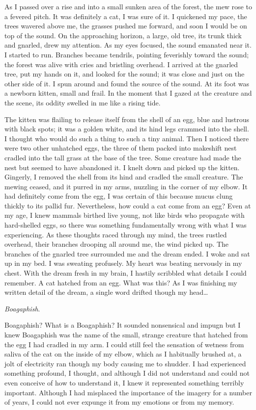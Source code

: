 \documentclass[
]{article}
\begin{document}
As I passed over a rise and into a small sunken area of the forest, the
mew rose to a fevered pitch. It was definitely a cat, I was sure of it.
I quickened my pace, the trees wavered above me, the grasses pushed me
forward, and soon I would be on top of the sound. On the approaching
horizon, a large, old tree, its trunk thick and gnarled, drew my
attention. As my eyes focused, the sound emanated near it. I started to
run. Branches became tendrils, pointing feverishly toward the sound; the
forest was alive with cries and bristling overhead. I arrived at the
gnarled tree, put my hands on it, and looked for the sound; it was close
and just on the other side of it. I spun around and found the source of
the sound. At its foot was a newborn kitten, small and frail. In the
moment that I gazed at the creature and the scene, its oddity swelled in
me like a rising tide.

The kitten was flailing to release itself from the shell of an egg, blue
and lustrous with black spots; it was a golden white, and its hind legs
crammed into the shell. I thought who would do such a thing to such a
tiny animal. Then I noticed there were two other unhatched eggs, the
three of them packed into makeshift nest cradled into the tall grass at
the base of the tree. Some creature had made the nest but seemed to have
abandoned it. I knelt down and picked up the kitten. Gingerly, I removed
the shell from its hind and cradled the small creature. The mewing
ceased, and it purred in my arms, nuzzling in the corner of my elbow. It
had definitely come from the egg, I was certain of this because mucus
clung thickly to its pallid fur. Nevertheless, how could a cat come from
an egg? Even at my age, I knew mammals birthed live young, not like
birds who propagate with hard-shelled eggs, so there was something
fundamentally wrong with what I was experiencing. As these thoughts
raced through my mind, the trees rustled overhead, their branches
drooping all around me, the wind picked up. The branches of the gnarled
tree surrounded me and the dream ended. I woke and sat up in my bed. I
was sweating profusely. My heart was beating nervously in my chest. With
the dream fresh in my brain, I hastily scribbled what details I could
remember. A cat hatched from an egg. What was this? As I was finishing
my written detail of the dream, a single word drifted though my
head\ldots{}

\emph{Boagaphish}.

Boagaphish? What is a Boagaphish? It sounded nonsensical and impugn but
I knew Boagaphish was the name of the small, strange creature that
hatched from the egg I had cradled in my arm. I could still feel the
sensation of wetness from saliva of the cat on the inside of my elbow,
which as I habitually brushed at, a jolt of electricity ran though my
body causing me to shudder. I had experienced something profound, I
thought, and although I did not understand and could not even conceive
of how to understand it, I knew it represented something terribly
important. Although I had misplaced the importance of the imagery for a
number of years, I could not ever expunge it from my emotions or from my
memory.
\end{document}
